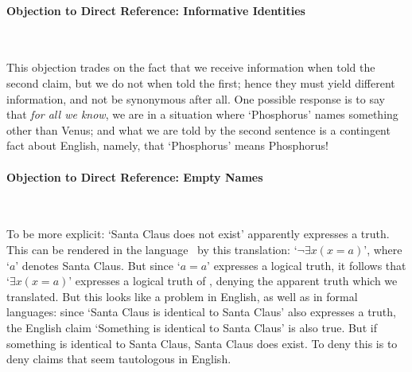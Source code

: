 \paragraph{Objection to Direct Reference: Informative Identities}

~

This objection trades on the fact that we receive information when told the second claim, but we do not when told the first; hence they must yield different information, and not be synonymous after all. One possible response is to say that \emph{for all we know}, we are in a situation where `Phosphorus' names something other than Venus; and what we are told by the second sentence is a contingent fact about English, namely, that `Phosphorus' means Phosphorus!

\paragraph{Objection to Direct Reference: Empty Names}

~



To be more explicit: `Santa Claus does not exist' apparently expresses a truth. This can be rendered in the language \lequ\ by this translation: `$\neg \exists x (x= a)$', where `$a$' denotes Santa Claus. But since `$a=a$' expresses a logical truth, it follows that `$\exists x (x = a)$' expresses a logical truth of \lequ, denying the apparent truth which we translated. But this looks like a problem in English, as well as in formal languages: since `Santa Claus is identical to Santa Claus' also expresses a truth, the English claim `Something is identical to Santa Claus' is also true. But if something is identical to Santa Claus, Santa Claus does exist. To deny this is to deny claims that seem tautologous in English. 

